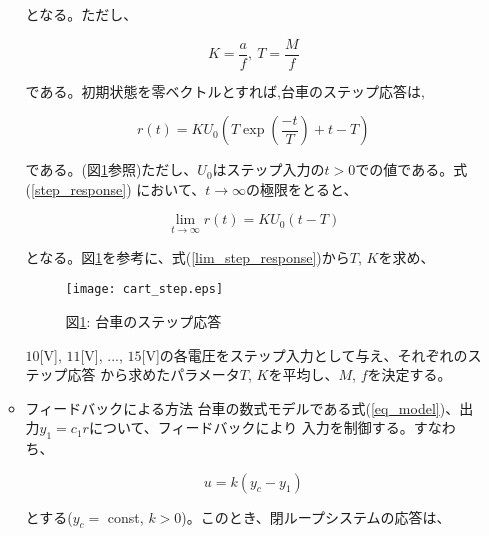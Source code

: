 \documentclass[a4j,11pt,twoside]{jbook}
\begin{document}
\begin{enumerate}
\begin{itemize}
        となる。ただし、

        \begin{equation}
            K = \frac{a}{f},\ T = \frac{M}{f}
        \end{equation}

        である。初期状態を零ベクトルとすれば,台車のステップ応答は,

        \begin{equation}
            r(t) = KU_{0}
            \left(
                T\exp \left(\frac{-t}{T} \right) + t - T
            \right)
            \label{step_response}
        \end{equation}

        である。(図\ref{cart_step}参照)ただし、$U_{0}$はステップ入力の$t > 0$での値である。式(\ref{step_response})
        において、$t \to \infty$の極限をとると、

        \begin{equation}
            \lim_{t \to \infty} r(t) = KU_{0}(t - T)
            \label{lim_step_response}
        \end{equation}

        となる。図\ref{cart_step}を参考に、式(\ref{lim_step_response})から$T$, $K$を求め、

        \begin{figure}[htbp]
            \begin{center}
                \texttt{[image: cart\_step.eps]}
                \caption{図\ref{cart_step}: 台車のステップ応答}
                \label{cart_step}
            \end{center}
        \end{figure}

        $10$[V], $11$[V], ..., $15$[V]の各電圧をステップ入力として与え、それぞれのステップ応答
        から求めたパラメータ$T$, $K$を平均し、$M$, $f$を決定する。

        \newpage
        \item フィードバックによる方法
        \quad 台車の数式モデルである式(\ref{eq_model})、出力$y_{1} = c_{1}r$について、フィードバックにより
        入力を制御する。すなわち、

        \begin{equation}
            u = k(y_{c} - y_{1})
        \end{equation}

        とする($y_{c} =$ const, $k > 0$)。このとき、閉ループシステムの応答は、


\end{itemize}
\end{enumerate}
\end{document}
